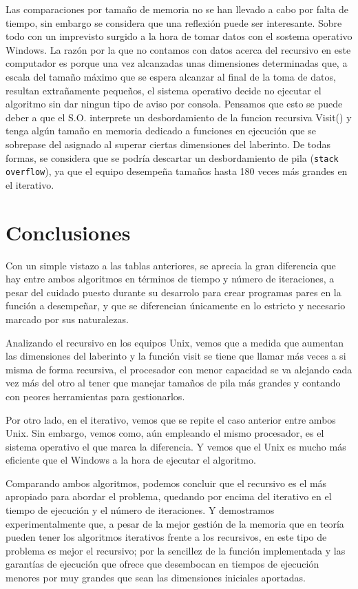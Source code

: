 \documentclass[12pt,a4paper]{article}
\begin{document}
 \vspace{0.2cm}
Las comparaciones por tamaño de memoria no se han llevado a cabo por falta de tiempo, sin embargo se considera que una reflexión puede ser interesante. Sobre todo con un imprevisto surgido a la hora de tomar datos con el sostema operativo Windows. La razón por la que no contamos con datos acerca del recursivo en este computador es porque una vez alcanzadas unas dimensiones determinadas que, a escala del tamaño máximo que se espera alcanzar al final de la toma de datos, resultan extrañamente pequeños, el sistema operativo decide no ejecutar el algoritmo sin dar ningun tipo de aviso por consola. Pensamos que esto se puede deber a que el S.O. interprete un desbordamiento de la funcion recursiva \textsf{Visit()} y tenga algún tamaño en memoria dedicado a funciones en ejecución que se sobrepase del asignado al superar ciertas dimensiones del laberinto. De todas formas, se considera que se podría descartar un desbordamiento de pila (\verb|stack overflow|), ya que el equipo desempeña tamaños hasta 180 veces más grandes en el iterativo.

\clearpage
\section{Conclusiones}

Con un simple vistazo a las tablas anteriores, se aprecia la gran diferencia que hay entre ambos algoritmos en términos de tiempo y número de iteraciones, a pesar del cuidado puesto durante su desarrolo para crear programas pares en la función a desempeñar, y que se diferencian únicamente en lo estricto y necesario marcado por sus naturalezas. 

\vspace{0.2cm}
Analizando el recursivo en los equipos Unix, vemos que a medida que aumentan las dimensiones del laberinto y la función visit se tiene que llamar más veces a si misma de forma recursiva, el procesador con menor capacidad se va alejando cada vez más del otro al tener que manejar tamaños de pila más grandes y contando con peores herramientas para gestionarlos.  

\vspace{0.2cm}
Por otro lado, en el iterativo, vemos que se repite el caso anterior entre ambos Unix. Sin embargo, vemos como, aún empleando el mismo procesador, es el sistema operativo el que marca la diferencia. Y vemos que el Unix es mucho más eficiente que el Windows a la hora de ejecutar el algoritmo. 

\vspace{0.2cm}
Comparando ambos algoritmos, podemos concluir que el recursivo es el más apropiado para abordar el problema, quedando por encima del iterativo en el tiempo de ejecución y el número de iteraciones. Y demostramos experimentalmente que, a pesar de la mejor gestión de la memoria que en teoría pueden tener los algoritmos iterativos frente a los recursivos, en este tipo de problema es mejor el recursivo; por la sencillez de la función implementada y las garantías de ejecución que ofrece que desembocan en tiempos de ejecución menores por muy grandes que sean las dimensiones iniciales aportadas. 
\clearpage


\end{document}
